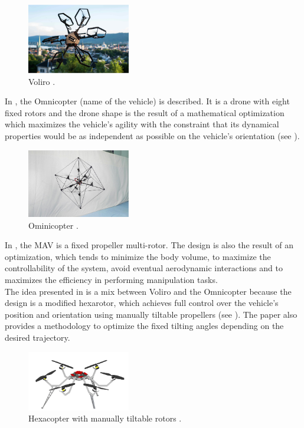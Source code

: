 \begin{figure}[h]
\centering
\includegraphics[width=0.4\textwidth]{images/voliro.png}
\caption{Voliro \citep{kamel_voliro:_2018}.}
\label{fig:voliro}
\end{figure}

In \citep{brescianini_design_2016}, the Omnicopter (name of the vehicle) is described.
It is a drone with eight fixed rotors and the drone shape is the result of a mathematical
optimization which maximizes the vehicle’s agility with the constraint that its
dynamical properties would be as independent as possible on the vehicle's orientation
(see ).

\begin{figure}[h]
\centering
\includegraphics[width=0.4\textwidth]{images/idsc.jpg}
\caption{Ominicopter \citep{brescianini_design_2016}.}
\label{fig:omnicopter}
\end{figure}

In \citep{nikou_mechanical_2015}, the MAV is a fixed propeller multi-rotor.
The design is also the result of an optimization, which tends to minimize the
body volume, to maximize the controllability of the system, avoid eventual
aerodynamic interactions and to maximizes the efficiency in performing
manipulation tasks. \\
The idea presented in \citep{rajappa_modeling_2015} is a mix between
Voliro and the Omnicopter because the design is a modified hexarotor,
which achieves full control over the vehicle’s position and orientation using
manually tiltable propellers (see ). The paper also provides
a methodology to optimize the fixed tilting angles depending on the desired trajectory.

\begin{figure}[h]
  \centering
  \includegraphics[width=0.4\textwidth]{images/hexacopter.png}
  \caption{Hexacopter with manually tiltable rotors \citep{rajappa_modeling_2015}.}
  \label{fig:hexacopter}
\end{figure}

